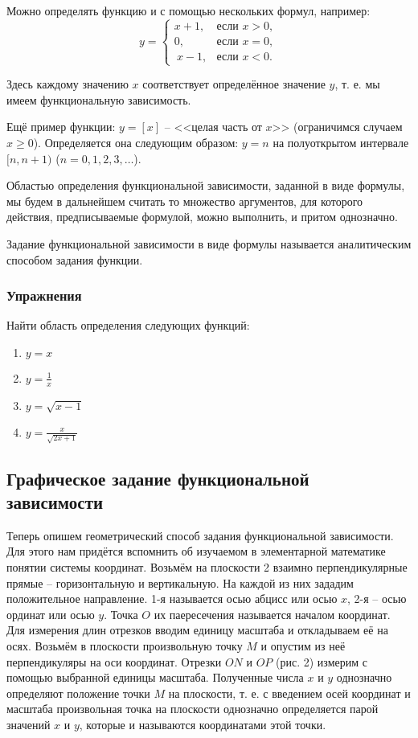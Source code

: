 Можно определять функцию и с помощью нескольких формул, например:
$$y = \begin{cases}
	x + 1, &\text{если $x > 0$,}\\
	0, &\text{если $x = 0$},\\\
	x - 1, &\text{если $x < 0$}.
\end{cases}$$

Здесь каждому значению $x$ соответствует определённое значение $y$, т. е. мы
имеем функциональную зависимость.

Ещё пример функции: $y = [x]$ -- <<целая часть от $x$>> (ограничимся случаем $x
\geq 0$). Определяется она следующим образом: $y = n$ на полуоткрытом интервале
$[n, n + 1)$ ($n = 0, 1, 2, 3, \ldots$).

Областью определения функциональной зависимости, заданной в виде формулы, мы
будем в дальнейшем считать то множество аргументов, для которого действия,
предписываемые формулой, можно выполнить, и притом однозначно.

Задание функциональной зависимости в виде формулы называется аналитическим
способом задания функции.

\subsubsection{Упражнения}
Найти область определения следующих функций:
\begin{enumerate}
	\item $y = x$
	\item $y = \frac{1}{x}$
	\item $y = \sqrt{x - 1}$
	\item $y = \frac{x}{\sqrt{2x + 1}}$
\end{enumerate}

\subsection{Графическое задание функциональной зависимости}
Теперь опишем геометрический способ задания функциональной зависимости. Для
этого нам придётся вспомнить об изучаемом в элементарной математике понятии
системы координат. Возьмём на плоскости 2 взаимно перпендикулярные прямые --
горизонтальную и вертикальную. На каждой из них зададим положительное
направление. 1-я называется осью абцисс или осью $x$, 2-я -- осью ординат или
осью $y$. Точка $O$ их паересечения называется началом координат. Для измерения
длин отрезков вводим единицу масштаба и откладываем её на осях. Возьмём в
плоскости произвольную точку $M$ и опустим из неё перпендикуляры на оси
координат. Отрезки $ON$ и $OP$ (рис. 2) измерим с помощью выбранной единицы
масштаба. Полученные числа $x$ и $y$ однозначно определяют положение точки $M$
на плоскости, т. е. с введением осей координат и масштаба произвольная точка на
плоскости однозначно определяется парой значений $x$ и $y$, которые и
называются координатами этой точки.

